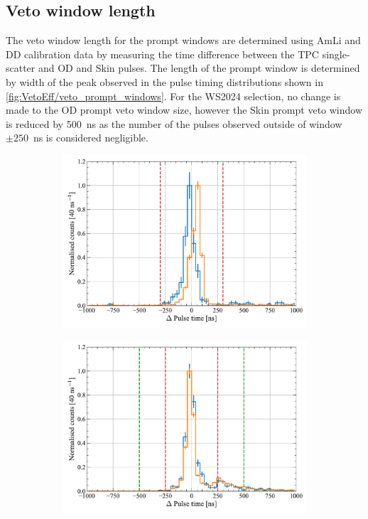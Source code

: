 \subsection{Veto window length}
The veto window length for the prompt windows are determined using AmLi and DD calibration data by measuring the time difference between the TPC single-scatter and OD and Skin pulses. The length of the prompt window is determined by width of the peak observed in the pulse timing distributions shown in \autoref{fig:VetoEff/veto_prompt_windows}. For the WS2024 selection, no change is made to the OD prompt veto window size, however the Skin prompt veto window is reduced by 500~ns as the number of the pulses observed outside of window $\pm250$~ns is considered negligible.
\begin{figure}[!ht]
	\centering
	\begin{subfigure}[b]{0.49\textwidth}
		\centering
		\includegraphics[width=\textwidth]{figures/VetoEfficiency/ODpromptWindowTiming.pdf}
        \caption{}
		\label{fig:VetoEff/od_prompt_window}
	\end{subfigure}
	\hfill
	\begin{subfigure}[b]{0.49\textwidth}
		\centering
		\includegraphics[width=\textwidth]{figures/VetoEfficiency/SkinpromptWindowTiming.pdf}

\end{subfigure}
\end{figure}
